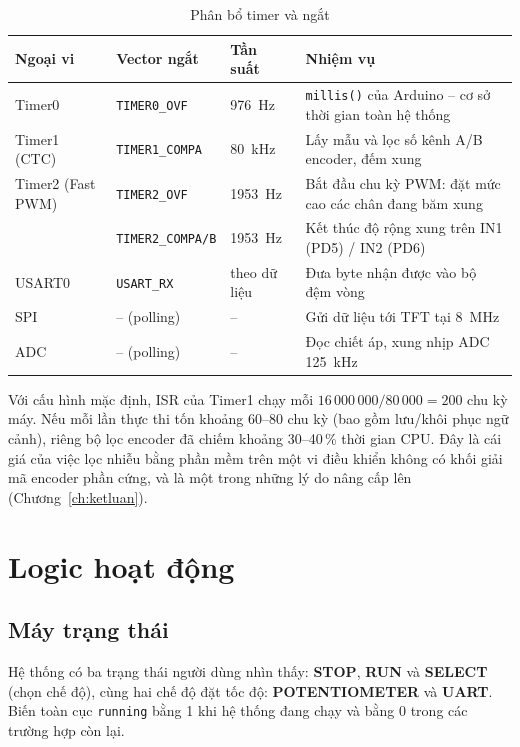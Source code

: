 \begin{table}[H]
\centering\small
\caption{Phân bổ timer và ngắt}
\label{tab:interrupts}
\begin{tabularx}{\linewidth}{@{}lll>{\raggedright\arraybackslash}X@{}}
\toprule
\textbf{Ngoại vi} & \textbf{Vector ngắt} & \textbf{Tần suất} & \textbf{Nhiệm vụ}\\
\midrule
Timer0 & \texttt{TIMER0\_OVF} & \SI{976}{\hertz} & \texttt{millis()} của Arduino -- cơ sở thời gian toàn hệ thống\\
Timer1 (CTC) & \texttt{TIMER1\_COMPA} & \SI{80}{\kilo\hertz} & Lấy mẫu và lọc số kênh A/B encoder, đếm xung\\
Timer2 (Fast PWM) & \texttt{TIMER2\_OVF} & \SI{1953}{\hertz} & Bắt đầu chu kỳ PWM: đặt mức cao các chân đang băm xung\\
 & \texttt{TIMER2\_COMPA/B} & \SI{1953}{\hertz} & Kết thúc độ rộng xung trên IN1 (PD5) / IN2 (PD6)\\
USART0 & \texttt{USART\_RX} & theo dữ liệu & Đưa byte nhận được vào bộ đệm vòng\\
SPI & -- (polling) & -- & Gửi dữ liệu tới TFT tại \SI{8}{\mega\hertz}\\
ADC & -- (polling) & -- & Đọc chiết áp, xung nhịp ADC \SI{125}{\kilo\hertz}\\
\bottomrule
\end{tabularx}
\end{table}

Với cấu hình mặc định, ISR của Timer1 chạy mỗi $16\,000\,000/80\,000=200$ chu kỳ máy. Nếu mỗi lần thực thi tốn khoảng 60--80 chu kỳ (bao gồm lưu/khôi phục ngữ cảnh), riêng bộ lọc encoder đã chiếm khoảng 30--40\,\% thời gian CPU. Đây là cái giá của việc lọc nhiễu bằng phần mềm trên một vi điều khiển không có khối giải mã encoder phần cứng, và là một trong những lý do nâng cấp lên \projpro{} (Chương~\ref{ch:ketluan}).

\section{Logic hoạt động}

\subsection{Máy trạng thái}
Hệ thống có ba trạng thái người dùng nhìn thấy: \textbf{STOP}, \textbf{RUN} và \textbf{SELECT} (chọn chế độ), cùng hai chế độ đặt tốc độ: \textbf{POTENTIOMETER} và \textbf{UART}. Biến toàn cục \texttt{running} bằng 1 khi hệ thống đang chạy và bằng 0 trong các trường hợp còn lại.

